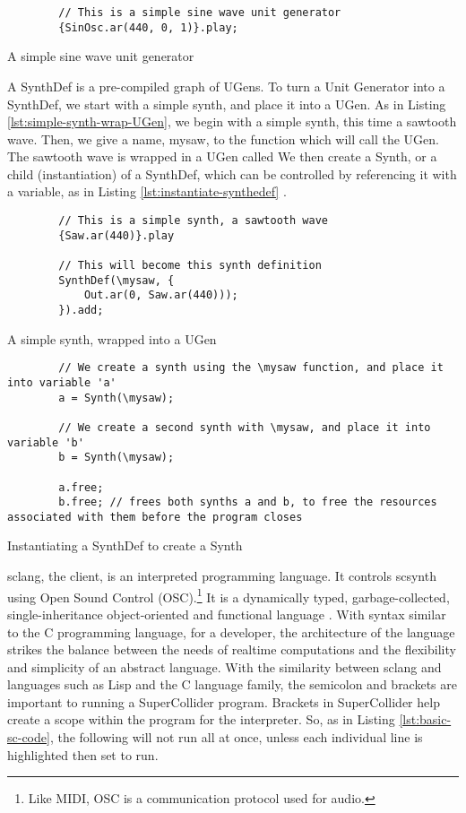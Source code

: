 \begin{listing}
	\begin{lstlisting}
		// This is a simple sine wave unit generator
		{SinOsc.ar(440, 0, 1)}.play;
	\end{lstlisting}
	\caption{A simple sine wave unit generator}
	\label{lst:sine-wave-ug}
\end{listing}

A SynthDef is a pre-compiled graph of UGens. To turn a Unit Generator into a SynthDef, we start with a simple synth, and place it into a UGen. As in Listing \ref{lst:simple-synth-wrap-UGen}, we begin with a simple synth, this time a sawtooth wave. Then, we give a name, mysaw, to the function which will call the UGen. The sawtooth wave is wrapped in a UGen called  We then create a Synth, or a child (instantiation) of a SynthDef, which can be controlled by referencing it with a variable, as in Listing \ref{lst:instantiate-synthedef} \cite{McCartney_2021}.

\begin{listing}
	\begin{lstlisting}
		// This is a simple synth, a sawtooth wave
		{Saw.ar(440)}.play
		
		// This will become this synth definition
		SynthDef(\mysaw, {
			Out.ar(0, Saw.ar(440)));
		}).add;
	\end{lstlisting}
	\caption{A simple synth, wrapped into a UGen}
	\label{lst:simple-synth-wrap-UGen}
\end{listing}

\begin{listing}
	\begin{lstlisting}
		// We create a synth using the \mysaw function, and place it into variable 'a'
		a = Synth(\mysaw);
		
		// We create a second synth with \mysaw, and place it into variable 'b'
		b = Synth(\mysaw);
		
		a.free;
		b.free; // frees both synths a and b, to free the resources associated with them before the program closes
	\end{lstlisting}
	\caption{Instantiating a SynthDef to create a Synth}
	\label{lst:instantiate-synthedef}
\end{listing}

sclang, the client, is an interpreted programming language. It controls scsynth using Open Sound Control (OSC).\footnote{Like MIDI, OSC is a communication protocol used for audio.} It is a dynamically typed, garbage-collected, single-inheritance object-oriented and functional language \cite{McCartney_2021}. With syntax similar to the C programming language, for a developer, the architecture of the language strikes the balance between the needs of realtime computations and the flexibility and simplicity of an abstract language. With the similarity between sclang and languages such as Lisp and the C language family, the semicolon and brackets are important to running a SuperCollider program. Brackets in SuperCollider help create a scope within the program for the interpreter. So, as in Listing \ref{lst:basic-sc-code}, the following will not run all at once, unless each individual line is highlighted then set to run.

